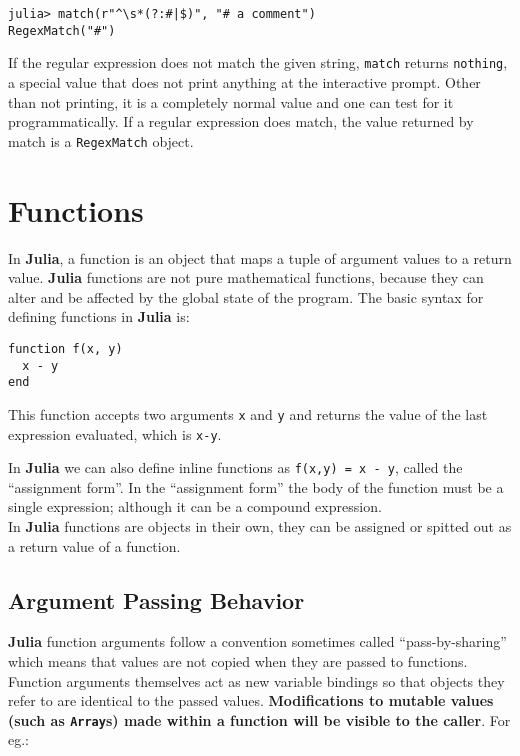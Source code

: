 \documentclass[
]{article}
\begin{document}
\begin{verbatim}
julia> match(r"^\s*(?:#|$)", "# a comment")
RegexMatch("#")
\end{verbatim}

If the regular expression does not match the given string,
\texttt{match} returns \texttt{nothing}, a special value that does not
print anything at the interactive prompt. Other than not printing, it is
a completely normal value and one can test for it programmatically. If a
regular expression does match, the value returned by match is a
\texttt{RegexMatch} object.

\newpage

\hypertarget{functions}{%
\section{Functions}\label{functions}}

In \textbf{Julia}, a function is an object that maps a tuple of argument
values to a return value. \textbf{Julia} functions are not pure
mathematical functions, because they can alter and be affected by the
global state of the program. The basic syntax for defining functions in
\textbf{Julia} is:

\begin{verbatim}
function f(x, y)
  x - y
end
\end{verbatim}

This function accepts two arguments \texttt{x} and \texttt{y} and
returns the value of the last expression evaluated, which is
\texttt{x-y}.

In \textbf{Julia} we can also define inline functions as
\texttt{f(x,y)\ =\ x\ -\ y}, called the ``assignment form''. In the
``assignment form'' the body of the function must be a single
expression; although it can be a compound expression.\\
In \textbf{Julia} functions are objects in their own, they can be
assigned or spitted out as a return value of a function.

\hypertarget{argument-passing-behavior}{%
\subsection{Argument Passing Behavior}\label{argument-passing-behavior}}

\textbf{Julia} function arguments follow a convention sometimes called
``pass-by-sharing'' which means that values are not copied when they are
passed to functions. Function arguments themselves act as new variable
bindings so that objects they refer to are identical to the passed
values. \textbf{Modifications to mutable values (such as
\texttt{Array}s) made within a function will be visible to the caller}.
For eg.:
\end{document}
